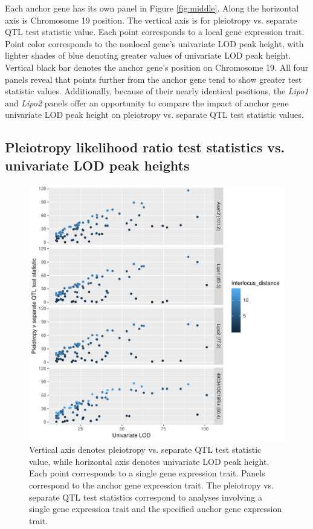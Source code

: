 \documentclass{article}
\begin{document}
Each anchor gene has its own panel in Figure \ref{fig:middle}. Along the horizontal axis is Chromosome 19 position. The vertical axis is for pleiotropy vs. separate QTL test statistic value. Each point corresponds to a local gene expression trait. Point color corresponds to the nonlocal gene's univariate LOD peak height, with lighter shades of blue denoting greater values of univariate LOD peak height. Vertical black bar denotes the anchor gene's position on Chromosome 19. All four panels reveal that points further from the anchor gene tend to show greater test statistic values. Additionally, because of their nearly identical positions, the \emph{Lipo1} and \emph{Lipo2} panels offer an opportunity to compare the impact of anchor gene univariate LOD peak height on pleiotropy vs. separate QTL test statistic values.




\subsection{Pleiotropy likelihood ratio test statistics vs. univariate LOD peak heights}

\begin{figure}
    \centering
    \includegraphics[width = \textwidth]{../Rmd/lrt-v-univariate-lod.pdf}
    \caption{Vertical axis denotes pleiotropy vs. separate QTL test statistic value, while horizontal axis denotes univariate LOD peak height. Each point corresponds to a single gene expression trait. Panels correspond to the anchor gene expression trait. The pleiotropy vs. separate QTL test statistics correspond to analyses involving a single gene expression trait and the specified anchor gene expression trait.}
    \label{fig:lod}
\end{figure}
\end{document}
